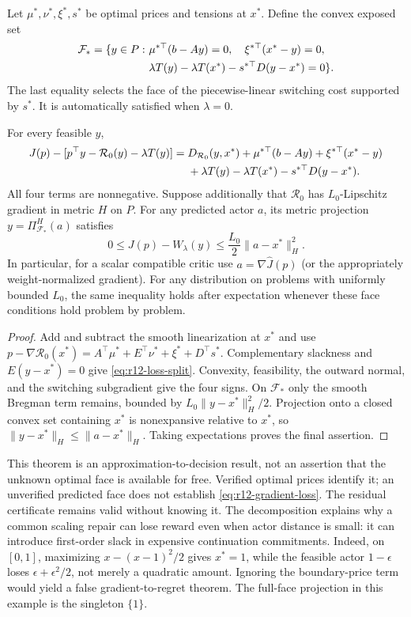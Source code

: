 Let $\mu^*,\nu^*,\xi^*,s^*$ be optimal prices and tensions at $x^*$. Define the convex exposed set
\begin{align}\label{eq:r12-face}
 \mathcal F_* =\{y\in P:\ &\mu^{*\top}(b-Ay)=0,\quad
                  \xi^{*\top}(x^*-y)=0,\notag\\
 &\lambda T(y)-\lambda T(x^*)-s^{*\top}D(y-x^*)=0\}.
\end{align}
The last equality selects the face of the piecewise-linear switching cost supported by $s^*$. It is automatically satisfied when $\lambda=0$.

\begin{theorem}\label{thm:r12-face}
For every feasible $y$,
\begin{align}
 J(p)-[p^\top y-\mathcal R_0(y)-\lambda T(y)]
 ={}&D_{\mathcal R_0}(y,x^*)+\mu^{*\top}(b-Ay)+\xi^{*\top}(x^*-y)\notag\\
 &+\lambda T(y)-\lambda T(x^*)-s^{*\top}D(y-x^*).\label{eq:r12-loss-split}
\end{align}
All four terms are nonnegative. Suppose additionally that $\mathcal R_0$ has $L_0$-Lipschitz gradient in metric $H$ on $P$. For any predicted actor $a$, its metric projection $y=\Pi_{\mathcal F_*}^H(a)$ satisfies
\begin{equation}\label{eq:r12-gradient-loss}
 0\leq J(p)-W_\lambda(y)\leq\frac{L_0}{2}\|a-x^*\|_H^2.
\end{equation}
In particular, for a scalar compatible critic use $a=\nabla\widehat J(p)$ (or the appropriately weight-normalized gradient). For any distribution on problems with uniformly bounded $L_0$, the same inequality holds after expectation whenever these face conditions hold problem by problem.
\end{theorem}
\begin{proof}
Add and subtract the smooth linearization at $x^*$ and use
$p-\nabla\mathcal R_0(x^*)=A^\top\mu^*+E^\top\nu^*+\xi^*+D^\top s^*$.
Complementary slackness and $E(y-x^*)=0$ give \eqref{eq:r12-loss-split}. Convexity, feasibility, the outward normal, and the switching subgradient give the four signs. On $\mathcal F_*$ only the smooth Bregman term remains, bounded by $L_0\|y-x^*\|_H^2/2$. Projection onto a closed convex set containing $x^*$ is nonexpansive relative to $x^*$, so $\|y-x^*\|_H\leq\|a-x^*\|_H$. Taking expectations proves the final assertion.
\end{proof}
This theorem is an approximation-to-decision result, not an assertion that the unknown optimal face is available for free. Verified optimal prices identify it; an unverified predicted face does not establish \eqref{eq:r12-gradient-loss}. The residual certificate remains valid without knowing it. The decomposition explains why a common scaling repair can lose reward even when actor distance is small: it can introduce first-order slack in expensive continuation commitments. Indeed, on $[0,1]$, maximizing $x-(x-1)^2/2$ gives $x^*=1$, while the feasible actor $1-\epsilon$ loses $\epsilon+\epsilon^2/2$, not merely a quadratic amount. Ignoring the boundary-price term would yield a false gradient-to-regret theorem. The full-face projection in this example is the singleton $\{1\}$.


